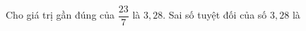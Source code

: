 \begin{ex}
Cho giá trị gần đúng của $\dfrac{23}{7}$ là $3{,}28$. Sai số tuyệt đối của số $3{,}28$ là
\end{ex}
